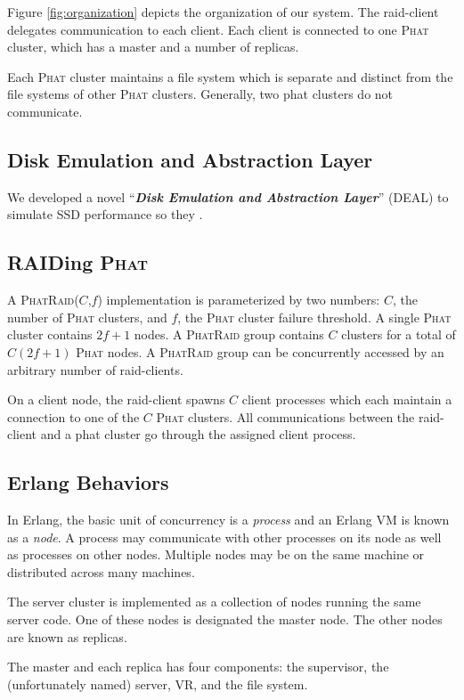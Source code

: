 \documentclass[10pt,letter]{article}
\newcommand{\phat}[0]{\textsc{Phat}}
\newcommand{\phatraid}[0]{\textsc{PhatRaid}}
\newcommand{\phatraidcf}[2]{\textsc{PhatRaid}(#1,#2)}
\begin{document}
Figure \ref{fig:organization} depicts the organization of our system. The
raid-client delegates communication to each client. Each client is connected to
one \phat{} cluster, which has a master and a number of replicas.

Each \phat{} cluster maintains a file system which is separate and distinct from
the file systems of other \phat{} clusters. Generally, two phat clusters do not
communicate.

\subsection{Disk Emulation and Abstraction Layer}

We developed a novel ``{\bf {\em Disk Emulation and Abstraction Layer}}'' (DEAL)
to simulate SSD performance so they .

\subsection{RAIDing \phat{}}

A \phatraidcf{$C$}{$f$} implementation is parameterized by two numbers: $C$, the
number of \phat{} clusters, and $f$, the \phat{} cluster failure threshold. A
single \phat{} cluster contains $2f + 1$ nodes. A \phatraid{} group contains $C$
clusters for a total of $C(2f+1)$ \phat{} nodes. A \phatraid{} group can be
concurrently accessed by an arbitrary number of raid-clients.

On a client node, the raid-client spawns $C$ client processes which each maintain
a connection to one of the $C$ \phat{} clusters. All communications between the
raid-client and a phat cluster go through the assigned client process.

\subsection{Erlang Behaviors}

In Erlang, the basic unit of concurrency is a \emph{process} and an Erlang VM is
known as a \emph{node}. A process may communicate with other processes on its
node as well as processes on other nodes. Multiple nodes may be on the same
machine or distributed across many machines.

The server cluster is implemented as a collection of nodes running the same
server code. One of these nodes is designated the master node. The other nodes
are known as replicas.

The master and each replica has four components: the supervisor, the
(unfortunately named) server, VR, and the file system.
\end{document}
